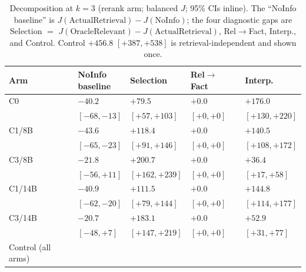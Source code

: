 \begin{table}[t]
\centering
\caption{Decomposition at $k=3$ (rerank arm; balanced $J$; 95\% CIs inline). The ``NoInfo baseline'' is $J(\mathrm{ActualRetrieval})-J(\mathrm{NoInfo})$; the four diagnostic gaps are Selection $=$ $J(\mathrm{OracleRelevant})-J(\mathrm{ActualRetrieval})$, Rel$\to$Fact, Interp., and Control. Control $+456.8$ $[+387,+538]$ is retrieval-independent and shown once.}
\label{tab:gaps}
{\small\setlength{\tabcolsep}{1pt}\renewcommand{\arraystretch}{1.0}
\begin{tabular}{@{}>{\raggedright\arraybackslash}p{3.00cm}*{4}{>{\centering\arraybackslash}p{1.85cm}}@{}}
\toprule
Arm & \shortstack{NoInfo\\baseline} & Selection & \shortstack{Rel$\to$\\Fact} & Interp. \\
\midrule
C0 & $-40.2$ & $+79.5$ & $+0.0$ & $+176.0$ \\
 & $[-68,-13]$ & $[+57,+103]$ & $[+0,+0]$ & $[+130,+220]$ \\
\addlinespace[1pt]
C1/8B & $-43.6$ & $+118.4$ & $+0.0$ & $+140.5$ \\
 & $[-65,-23]$ & $[+91,+146]$ & $[+0,+0]$ & $[+108,+172]$ \\
\addlinespace[1pt]
C3/8B & $-21.8$ & $+200.7$ & $+0.0$ & $+36.4$ \\
 & $[-56,+11]$ & $[+162,+239]$ & $[+0,+0]$ & $[+17,+58]$ \\
\addlinespace[1pt]
C1/14B & $-40.9$ & $+111.5$ & $+0.0$ & $+144.8$ \\
 & $[-62,-20]$ & $[+79,+144]$ & $[+0,+0]$ & $[+114,+177]$ \\
\addlinespace[1pt]
C3/14B & $-20.7$ & $+183.1$ & $+0.0$ & $+52.9$ \\
 & $[-48,+7]$ & $[+147,+219]$ & $[+0,+0]$ & $[+31,+77]$ \\
\midrule
Control (all arms) & \multicolumn{4}{c}{$+456.8$ $[+387,+538]$} \\
\bottomrule
\end{tabular}
}
\end{table}
